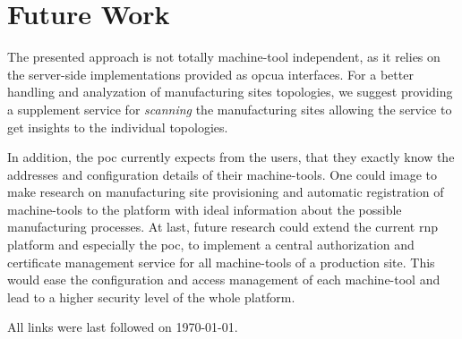 \documentclass[
a4paper,
twoside,
headsepline,
cleardoublepage=empty,
parskip=half,
draft=false
]{scrbook}
\begin{document}
		\section{Future Work}\label{sec:future_work}

			The presented approach is not totally machine-tool independent, as it relies on the server-side implementations provided as \gls{opcua} interfaces. For a better handling and analyzation of manufacturing sites topologies, we suggest providing a supplement service for \textit{scanning} the manufacturing sites allowing the service to get insights to the individual topologies.

			In addition, the \gls{poc} currently expects from the users, that they exactly know the addresses and configuration details of their machine-tools. One could image to make research on manufacturing site provisioning and automatic registration of machine-tools to the platform with ideal information about the possible manufacturing processes.
			At last, future research could extend the current \gls{rnp} platform and especially the \gls{poc}, to implement a central authorization and certificate management service for all machine-tools of a production site. This would ease the configuration and access management of each machine-tool and lead to a higher security level of the whole platform.

	\clearpage


	\printbibliography

	All links were last followed on \today.

	\pagestyle{empty}
	\renewcommand*{\chapterpagestyle}{empty}
	\Versicherung
\end{document}
